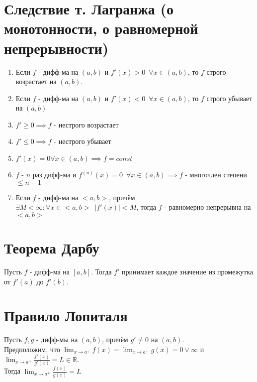 \documentclass[11pt, a4paper, utf-8]{article}
\def\R{\mathbb{R}}
\def\sp{\, \, \,}
\def\ds{\displaystyle}
\begin{document}
    \section{Следствие т. Лагранжа (о монотонности, о равномерной непрерывности)}
    \begin{enumerate}
        \item Если $f$ - дифф-ма на $(a,b)$ и $f'(x) > 0 \sp \forall x \in (a,b)$, то $f$ строго возрастает на $(a,b)$.
        \item Если $f$ - дифф-ма на $(a, b)$ и $f'(x) < 0 \sp \forall x \in (a,b)$, то $f$ строго убывает на $(a, b)$
        \item $f' \geq 0 \implies f$ - нестрого возрастает
        \item $f' \leq 0 \implies f$ - нестрого убывает
        \item $f'(x) = 0 \forall x \in (a,b) \implies f = const$
        \item $f$ - $n$ раз дифф-ма и $f^{(n)}(x) = 0 \sp \forall x \in (a,b) \implies f$ - многочлен степени $\leq n-1$
        \item Если $f$ - дифф-ма на $<a, b>$, причём $\exists M < \infty: \forall x \in <a,b> \sp |f'(x)| < M$, тогда $f$ - равномерно непрерывна на $<a, b>$
    \end{enumerate}

    \section{Теорема Дарбу}
    Пусть $f$ - дифф-ма на $[a, b]$. Тогда $f'$ принимает каждое значение из промежутка от $f'(a)$ до $f'(b)$.

    \section{Правило Лопиталя}
    Пусть $f, g$ - дифф-мы на $(a,b)$, причём $g' \neq 0$ на $(a,b)$.\\
    Предположим, что $\ds \lim_{x \to a^+} f(x) = \lim_{x \to a^+} g(x) = 0 \lor \infty$ и $\ds \lim_{x \to a^+} \frac{f'(x)}{g'(x)} = L \in \overline{\R}$.\\
    Тогда $\ds \lim_{x \to a^+} \frac{f(x)}{g(x)} = L$
\end{document}
